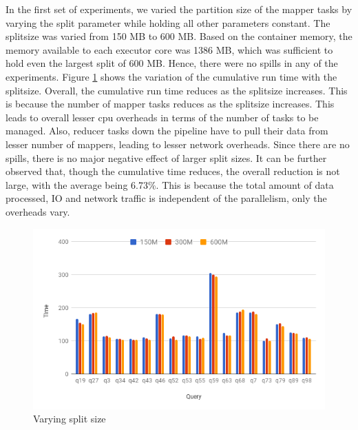 In the first set of experiments, we varied the partition size of the mapper tasks by varying the split parameter while holding all other parameters constant. The splitsize was varied from 150 MB to 600 MB. Based on the container memory, the memory available to each executor core was 1386 MB, which was sufficient to hold even the largest split of 600 MB. Hence, there were no spills in any of the experiments. Figure \ref{fig:varysplitsize} shows the variation of the cumulative run time with the splitsize. Overall, the cumulative run time reduces as the splitsize increases. This is because the number of mapper tasks reduces as the splitsize increases. This leads to overall lesser cpu overheads in terms of the number of tasks to be managed. Also, reducer tasks down the pipeline have to pull their data from lesser number of mappers, leading to lesser network overheads. Since there are no spills, there is no major negative effect of larger split sizes. It can be further observed that, though the cumulative time reduces, the overall reduction is not large, with the average being 6.73\%. This is because the total amount of data processed, IO and network traffic is independent of the parallelism, only the overheads vary. 

\begin{figure}[h]
	\includegraphics[width=\linewidth]{fig/varysplitsize.png}
	\caption{Varying split size \protect\footnotemark[1]}
	\label{fig:varysplitsize}
\end{figure}

